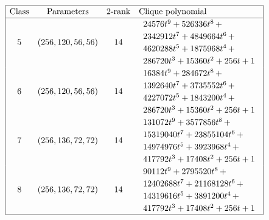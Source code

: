 \documentclass[12pt,a4paper]{article}
\begin{document}
\newpage
\begin{table}[!bhpt] %
\small{}
\begin{align*}
\def\arraystretch{1.2}
\begin{array}{|cccl|}
\hline
\text{Class} &
\text{Parameters} &
\text{2-rank} &
\text{Clique polynomial}
\\
\hline
5 &
(256, 120, 56, 56) &
14 &
\begin{array}{l}
24576t^{9} + 526336t^{8}
\,+
\\
 2342912t^{7} + 4849664t^{6}
\,+
\\
 4620288t^{5} + 1875968t^{4}
\,+
\\
 286720t^{3} + 15360t^{2} + 256t + 1
\end{array}
\\
6 &
(256, 120, 56, 56) &
14 &
\begin{array}{l}
16384t^{9} + 284672t^{8}
\,+
\\
 1392640t^{7} + 3735552t^{6}
\,+
\\
 4227072t^{5} + 1843200t^{4}
\,+
\\
 286720t^{3} + 15360t^{2} + 256t + 1
\end{array}
\\
7 &
(256, 136, 72, 72) &
14 &
\begin{array}{l}
131072t^{9} + 3577856t^{8}
\,+
\\
 15319040t^{7} + 23855104t^{6}
\,+
\\
 14974976t^{5} + 3923968t^{4}
\,+
\\
 417792t^{3} + 17408t^{2} + 256t + 1
\end{array}
\\
8 &
(256, 136, 72, 72) &
14 &
\begin{array}{l}
90112t^{9} + 2795520t^{8}
\,+
\\
 12402688t^{7} + 21168128t^{6}
\,+
\\
 14319616t^{5} + 3891200t^{4}
\,+
\\
 417792t^{3} + 17408t^{2} + 256t + 1
\end{array}
\\
\hline
\end{array}
\end{align*}
\caption{$f_{8,6}$ extended Cayley classes (part 2)}
\label{tab-c8_6_EC_classes_2}
\end{table}
\end{document}
